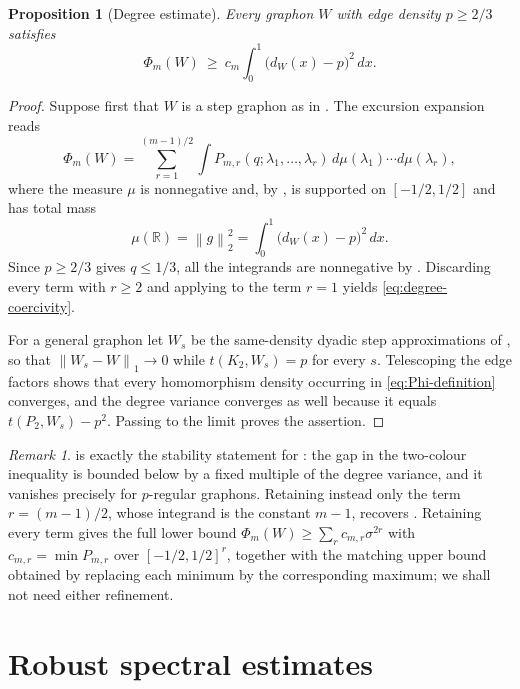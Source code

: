 \documentclass[11pt]{article}
\newtheorem{proposition}[theorem]{Proposition}
\theoremstyle{remark}
\newtheorem{remark}[theorem]{Remark}
\newcommand{\R}{\mathbb{R}}
\newcommand{\norm}[1]{\left\lVert #1\right\rVert}
\begin{document}
\begin{proposition}[Degree estimate]\label{prop:degree}
Every graphon $W$ with edge density $p\geq2/3$ satisfies
\begin{equation}\label{eq:degree-coercivity}
 \Phi_m(W)\ \geq\ c_m\int_0^1\bigl(d_W(x)-p\bigr)^2\,dx .
\end{equation}
\end{proposition}

\begin{proof}
Suppose first that $W$ is a step graphon as in
\cite[Section~2]{kim2026goodman}. The excursion expansion
\cite[Eq.~(3.10)]{kim2026goodman} reads
\[
 \Phi_m(W)=\sum_{r=1}^{(m-1)/2}
 \int P_{m,r}(q;\lambda_1,\ldots,\lambda_r)
       \,d\mu(\lambda_1)\cdots d\mu(\lambda_r),
\]
where the measure $\mu$ is nonnegative and, by
\cite[Lemma~2.2 and Eq.~(2.3)]{kim2026goodman}, is supported on $[-1/2,1/2]$ and
has total mass
\[
 \mu(\R)=\norm{g}_2^2=\int_0^1\bigl(d_W(x)-p\bigr)^2\,dx .
\]
Since $p\geq2/3$ gives $q\leq1/3$, all the integrands are nonnegative by
\cite[Section~5]{kim2026goodman}. Discarding every term with $r\geq2$ and applying
 to the term $r=1$ yields
\eqref{eq:degree-coercivity}.

For a general graphon let $W_s$ be the same-density dyadic step
approximations of \cite[Lemma~2.1 and Appendix~A]{kim2026goodman}, so that
$\norm{W_s-W}_1\to0$ while $t(K_2,W_s)=p$ for every $s$. Telescoping the
edge factors shows that every homomorphism density occurring in
\eqref{eq:Phi-definition} converges, and the degree variance converges as
well because it equals $t(P_2,W_s)-p^2$. Passing to the limit proves the
assertion.
\end{proof}

\begin{remark}
 is exactly the stability statement for
\cite[Theorem~1.3]{kim2026goodman}: the gap in the two-colour inequality is
bounded below by a fixed multiple of the degree variance, and it vanishes
precisely for $p$-regular graphons. Retaining instead only the term
$r=(m-1)/2$, whose integrand is the constant $m-1$, recovers
\cite[Proposition~6.1]{kim2026goodman}. Retaining every term gives the full
lower bound $\Phi_m(W)\geq\sum_r c_{m,r}\sigma^{2r}$ with
$c_{m,r}=\min P_{m,r}$ over $[-1/2,1/2]^r$, together with the matching
upper bound obtained by replacing each minimum by the corresponding
maximum; we shall not need either refinement.
\end{remark}

\section{Robust spectral estimates}
\label{sec:spectral}
\end{document}
